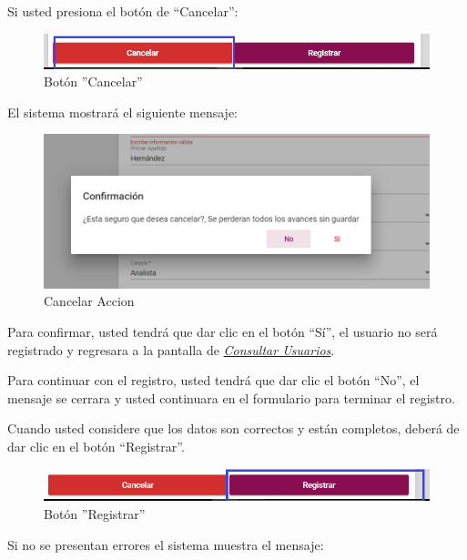     \newpage
            Si usted presiona el botón de “Cancelar”:

            \begin{figure}[H]
                \centering
                \hypertarget{cancel1}{\includegraphics[width=0.7\linewidth]{images/SP5/BtnCancelar1}}
                \caption{Botón ''Cancelar''}
                \label{cancel1}
            \end{figure}

            El sistema mostrará el siguiente mensaje:


             \begin{figure}[H]
            	\centering
            \includegraphics[width=0.4\linewidth]{images/SP5/MSG29}
            	\caption{Cancelar Accion}
            	\label{mensaje29}
            \end{figure}

            Para confirmar, usted tendrá que dar clic en el botón “Sí”, el usuario no será registrado y regresara a la pantalla de \hyperlink{consultarUs}{\textit{Consultar Usuarios}}.

            Para continuar con el registro, usted tendrá que  dar clic el botón “No”, el mensaje se cerrara y usted continuara en el formulario para terminar el registro.

            Cuando usted considere que los datos son correctos y están completos, deberá de dar clic en el botón “Registrar”.

            \begin{figure}[H]
                \centering
                \hypertarget{btnreg}{\includegraphics[width=0.7\linewidth]{images/SP5/BtnRegistrar}}
                \caption{Botón ''Registrar''}
                \label{btnreg}
            \end{figure}

            Si no se presentan errores el sistema muestra el mensaje:

